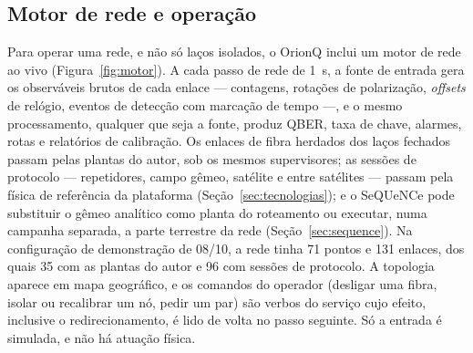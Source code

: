 \documentclass[12pt]{article}
\begin{document}
\subsection{Motor de rede e operação}
\label{sec:demo}

Para operar uma rede, e não só laços isolados, o OrionQ inclui um motor de rede
ao vivo (Figura~\ref{fig:motor}). A cada passo de rede de 1~s, a fonte de entrada
gera os observáveis brutos de cada enlace --- contagens, rotações de
polarização, \textit{offsets} de relógio, eventos de detecção com marcação de
tempo ---, e o mesmo processamento, qualquer que seja a fonte, produz QBER, taxa
de chave, alarmes, rotas e relatórios de calibração. Os enlaces de fibra herdados
dos laços fechados passam pelas plantas do autor, sob os mesmos supervisores; as
sessões de protocolo --- repetidores, campo gêmeo, satélite e entre satélites ---
passam pela física de referência da plataforma (Seção~\ref{sec:tecnologias}); e
o SeQUeNCe pode substituir o gêmeo analítico como planta do roteamento ou
executar, numa campanha separada, a parte terrestre da rede
(Seção~\ref{sec:sequence}). Na configuração de demonstração de 08/10, a rede tinha
71 pontos e 131 enlaces, dos quais 35 com as plantas do autor e 96 com sessões de
protocolo. A topologia aparece em mapa geográfico, e os comandos do operador
(desligar uma fibra, isolar ou recalibrar um nó, pedir um par) são verbos do
serviço cujo efeito, inclusive o redirecionamento, é lido de volta no passo
seguinte. Só a entrada é simulada, e não há atuação física.
\end{document}
